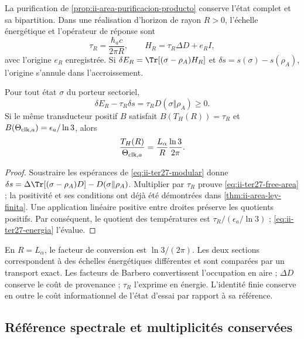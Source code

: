 La purification de \ref{prop:ii-area-purificacion-producto} conserve
l’état complet et sa bipartition. Dans une réalisation d’horizon de rayon
$R>0$, l’échelle énergétique et l’opérateur de réponse sont
\begin{equation}
 \tau_R=\frac{\hbar_ac}{2\pi R},\qquad
 H_R=\tau_R\Delta D+e_RI,
 \label{eq:ii-ter27-response}
\end{equation}
avec l’origine $e_R$ enregistrée. Si $\delta E_R=\Tr[(\sigma-\rho_A)H_R]$
et $\delta s=s(\sigma)-s(\rho_A)$, l’origine s’annule dans l’accroissement.

\begin{theorem}
\label{thm:ii-ter27-horizon}
Pour tout état $\sigma$ du porteur sectoriel,
\begin{equation}
 \delta E_R-\tau_R\delta s
 =\tau_R D(\sigma\Vert\rho_A)\ge0.
 \label{eq:ii-ter27-free-area}
\end{equation}
Si le même transducteur positif $B$ satisfait
$B(T_H(R))=\tau_R$ et
$B(\Theta_{{\rm clk},a})=\epsilon_a/\ln3$, alors
\begin{equation}
 \frac{T_H(R)}{\Theta_{{\rm clk},a}}
 =\frac{L_\alpha}{R}\frac{\ln3}{2\pi}.
 \label{eq:ii-ter27-clock-horizon}
\end{equation}
\end{theorem}
\begin{proof}
Soustraire les espérances de \eqref{eq:ii-ter27-modular} donne
$\delta s=\Delta\Tr[(\sigma-\rho_A)D]-D(\sigma\Vert\rho_A)$.
Multiplier par $\tau_R$ prouve \eqref{eq:ii-ter27-free-area} ; la
positivité et ses conditions ont déjà été démontrées dans
\ref{thm:ii-area-ley-finita}. Une application linéaire positive entre droites
préserve les quotients positifs. Par conséquent, le quotient des températures est
$\tau_R/(\epsilon_a/\ln3)$ ; \eqref{eq:ii-ter27-energia} l’évalue.
\end{proof}

En $R=L_\alpha$, le facteur de conversion est $\ln3/(2\pi)$.
Les deux sections correspondent à des échelles énergétiques différentes et sont
comparées par un transport exact. Les facteurs de Barbero convertissent
l’occupation en aire ; $\Delta D$ conserve le coût de provenance ; $\tau_R$
l’exprime en énergie. L’identité finie conserve en outre le coût
informationnel de l’état d’essai par rapport à sa référence.

\subsection{Référence spectrale et multiplicités conservées}
\label{subsec:ii-ter27-reference}

